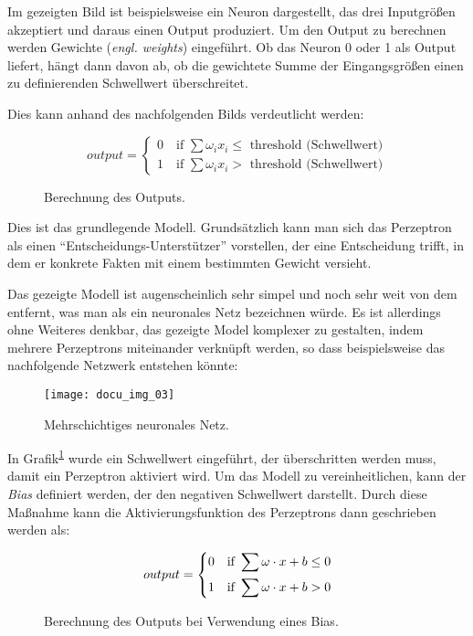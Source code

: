 Im gezeigten Bild ist beispielsweise ein Neuron dargestellt, das drei Inputgrößen akzeptiert und daraus einen Output
produziert. Um den Output zu berechnen werden Gewichte (\textit{engl. weights}) eingeführt. Ob das Neuron 0 oder 1 als
Output liefert, hängt dann davon ab, ob die gewichtete Summe der Eingangsgrößen einen zu definierenden Schwellwert
überschreitet.

Dies kann anhand des nachfolgenden Bilds verdeutlicht werden:

\begin{figure}[h]
    \centering
    \[ output =
      \begin{cases}
        0 \quad \text{if } \sum \omega_i x_i \leqslant \text{ threshold (Schwellwert)}\\
        1 \quad \text{if } \sum \omega_i x_i > \text{ threshold (Schwellwert)}
      \end{cases}
    \]
    \caption{Berechnung des Outputs.}
    \label{fig:neuron-three-way}
\end{figure}


Dies ist das grundlegende Modell. Grundsätzlich kann man sich das Perzeptron als einen ``Entscheidungs-Unterstützer''
vorstellen, der eine Entscheidung trifft, in dem er konkrete Fakten mit einem bestimmten Gewicht versieht.

Das gezeigte Modell ist augenscheinlich sehr simpel und noch sehr weit von dem entfernt, was man als ein neuronales
Netz bezeichnen würde. Es ist allerdings ohne Weiteres denkbar, das gezeigte Model komplexer zu gestalten, indem
mehrere Perzeptrons miteinander verknüpft werden, so dass beispielsweise das nachfolgende Netzwerk entstehen könnte:

\begin{figure}[h]
    \centering
    \texttt{[image: docu\_img\_03]}
    \caption{Mehrschichtiges neuronales Netz.}
    \label{fig:multi-layer-net}
\end{figure}

In Grafik\textsuperscript{\ref{fig:neuron-three-way}} wurde ein Schwellwert eingeführt, der überschritten werden muss, damit ein Perzeptron
aktiviert wird. Um das Modell zu vereinheitlichen, kann der \textit{Bias} definiert werden, der den
negativen Schwellwert darstellt. Durch diese Maßnahme kann die Aktivierungsfunktion des Perzeptrons dann geschrieben
werden als:

\begin{figure}[h]
    \centering
    \[ output =
          \begin{dcases}
            0 \quad \text{if } \sum \omega \cdot x + b \leq 0 \\
            1 \quad \text{if } \sum \omega \cdot x + b > 0
          \end{dcases}
    \]
    \caption{Berechnung des Outputs bei Verwendung eines Bias.}
    \label{fig:bias-calculation}
\end{figure}

